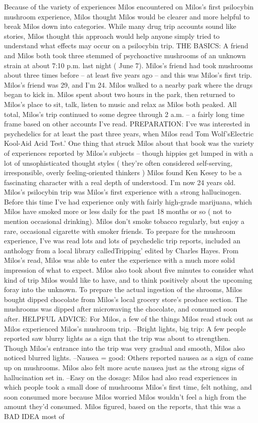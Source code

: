 \documentclass[12pt]{book}
\begin{document}
Because of the variety of experiences Milos encountered on Milos's first psilocybin mushroom experience, Milos thought Milos would be clearer and more helpful to break Milos down into categories. While many drug trip accounts sound like stories, Milos thought this approach would help anyone simply tried to understand what effects may occur on a psilocybin trip. THE BASICS: A friend and Milos both took three stemmed of psychoactive mushrooms of an unknown strain at about 7:10 p.m. last night ( June 7). Milos's friend had took mushrooms about three times before -- at least five years ago -- and this was Milos's first trip. Milos's friend was 29, and I'm 24. Milos walked to a nearby park where the drugs began to kick in. Milos spent about two hours in the park, then returned to Milos's place to sit, talk, listen to music and relax as Milos both peaked. All total, Milos's trip continued to some degree through 2 a.m. -- a fairly long time frame based on other accounts I've read. PREPARATION: I've was interested in psychedelics for at least the past three years, when Milos read Tom Wolf'sElectric Kool-Aid Acid Test.' One thing that struck Milos about that book was the variety of experiences reported by Milos's subjects -- though hippies get lumped in with a lot of unsophisticated thought styles ( they're often considered self-serving, irresponsible, overly feeling-oriented thinkers ) Milos found Ken Kesey to be a fascinating character with a real depth of understood. I'm now 24 years old. Milos's psilocybin trip was Milos's first experience with a strong hallucinogen. Before this time I've had experience only with fairly high-grade marijuana, which Milos have smoked more or less daily for the past 18 months or so ( not to mention occasional drinking). Milos don't smoke tobacco regularly, but enjoy a rare, occasional cigarette with smoker friends. To prepare for the mushroom experience, I've was read lots and lots of psychedelic trip reports, included an anthology from a local library calledTripping' edited by Charles Hayes. From Milos's read, Milos was able to enter the experience with a much more solid impression of what to expect. Milos also took about five minutes to consider what kind of trip Milos would like to have, and to think positively about the upcoming foray into the unknown. To prepare the actual ingestion of the shrooms, Milos bought dipped chocolate from Milos's local grocery store's produce section. The mushrooms was dipped after microwaving the chocolate, and consumed soon after. HELPFUL ADVICE: For Milos, a few of the things Milos read stuck out as Milos experienced Milos's mushroom trip. --Bright lights, big trip: A few people reported saw blurry lights as a sign that the trip was about to strengthen. Though Milos's entrance into the trip was very gradual and smooth, Milos also noticed blurred lights. --Nausea = good: Others reported nausea as a sign of came up on mushrooms. Milos also felt more acute nausea just as the strong signs of hallucination set in. --Easy on the dosage: Milos had also read experiences in which people took a small dose of mushrooms Milos's first time, felt nothing, and soon consumed more because Milos worried Milos wouldn't feel a high from the amount they'd consumed. Milos figured, based on the reports, that this was a BAD IDEA most of 
\end{document}
